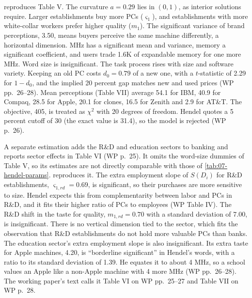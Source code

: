  reproduces Table V. The curvature $a = 0.29$ lies in $(0, 1)$, as interior solutions
require. Larger establishments buy more PCs ($\varsigma_1$), and establishments with more white-collar workers prefer
higher quality ($m_1$). The significant variance of brand perceptions, 3.50, means buyers perceive the same machine
differently, a horizontal dimension. MHz has a significant mean and variance, memory a significant coefficient,
and users trade 1.6K of expandable memory for one more MHz. Word size is insignificant. The task process rises
with size and software variety. Keeping an old PC costs $d_0 = 0.79$ of a new one, with a $t$-statistic of 2.29
for $1 - d_0$, and the implied 20 percent gap matches new and used prices (WP pp.~26--28). Mean perceptions
(Table VII) average 54.1 for IBM, 40.9 for Compaq, 28.5 for Apple, 20.1 for clones, 16.5 for Zenith and 2.9 for
AT\&T. The objective, 405, is treated as $\chi^2$ with 20 degrees of freedom. Hendel quotes a 5 percent cutoff of
30 (the exact value is 31.4), so the model is rejected (WP p.~26).

A separate estimation adds the R\&D and education sectors to banking and reports sector effects in Table VI (WP
p.~25). It omits the word-size dummies of Table V, so its estimates are not directly comparable with those of
\cref{tab:07-hendel-params}.
 reproduces it. The extra employment slope of $S(D_i)$ for R\&D establishments,
$\varsigma_{1,rd} = 0.69$, is significant, so their purchases are more sensitive to size. Hendel expects this from
complementarity between labor and PCs in R\&D, and it fits their higher ratio of PCs to employees (WP Table IV). The
R\&D shift in the taste for quality, $m_{1,rd} = 0.70$ with a standard deviation of 7.00, is insignificant. There is
no vertical dimension tied to the sector, which fits the observation that R\&D establishments do not hold more
valuable PCs than banks. The education sector's extra employment slope is also insignificant. Its extra taste for
Apple machines, 4.20, is ``borderline significant'' in Hendel's words, with a ratio to its standard deviation of 1.39.
He equates it to about 4 MHz, so a school values an Apple like a non-Apple machine with 4 more MHz (WP pp.~26--28).
The working paper's text calls it Table VI on WP pp.~25--27 and Table VII on WP p.~28.

